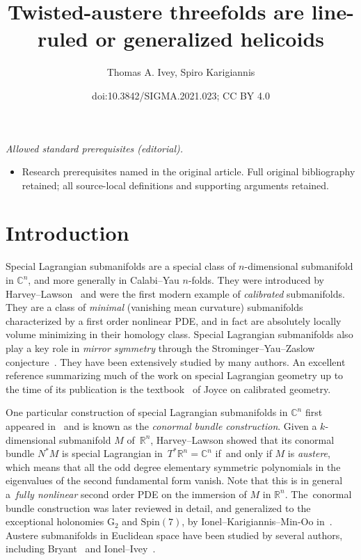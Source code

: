 \documentclass[10pt,a4paper]{amsart}
\title{Twisted-austere threefolds are line-ruled or generalized helicoids}
\author{Thomas A. Ivey, Spiro Karigiannis}
\date{doi:10.3842/SIGMA.2021.023; CC BY 4.0}
\def\R{\mathbb{R}}
\def\C{\mathbb{C}}
\numberwithin{equation}{section}
\begin{document}
\maketitle
\noindent\textit{Allowed standard prerequisites (editorial).}\begin{itemize}
\item Research prerequisites named in the original article. Full original bibliography retained; all source-local definitions and supporting arguments retained.
\end{itemize}\medskip
\section{Introduction}

Special Lagrangian submanifolds are a special class of $n$-dimensional submanifold in $\C^n$, and more generally in Calabi--Yau $n$-folds. They were introduced by Harvey--Lawson~\cite{HL} and were the first modern example of \emph{calibrated} submanifolds. They are a class of \emph{minimal} (vanishing mean curvature) submanifolds characterized by a first order nonlinear PDE, and in fact are absolutely locally volume minimizing in their homology class. Special Lagrangian submanifolds also play a key role in \emph{mirror symmetry} through the Strominger--Yau--Zaslow conjecture~\cite{SYZ}. They have been extensively studied by many authors. An excellent reference summarizing much of the work on special Lagrangian geometry up to the time of its publication is the textbook~\cite{J-book} of Joyce on calibrated geometry.

One particular construction of special Lagrangian submanifolds in $\C^n$ first appeared in~\cite{HL} and is known as the \emph{conormal bundle construction}. Given a $k$-dimensional submanifold $M$ of~$\R^n$, Harvey--Lawson showed that its conormal bundle $N^*M$ is special Lagrangian in~\mbox{$T^* \R^n = \C^n$} if~and only if $M$ is \emph{austere}, which means that all the odd degree elementary symmetric polynomials in the eigenvalues of the second fundamental form vanish. Note that this is in general a~\emph{fully nonlinear} second order PDE on the immersion of $M$ in $\R^n$. The~conormal bundle construction was later reviewed in detail, and generalized to the exceptional holonomies $\mathrm{G}_2$ and $\mathrm{Spin}(7)$, by Ionel--Karigiannis--Min-Oo in~\cite{IKM}. Austere submanifolds in Euclidean space have been studied by several authors, including Bryant~\cite{Br} and Ionel--Ivey~\cite{II,II2}.
\end{document}

